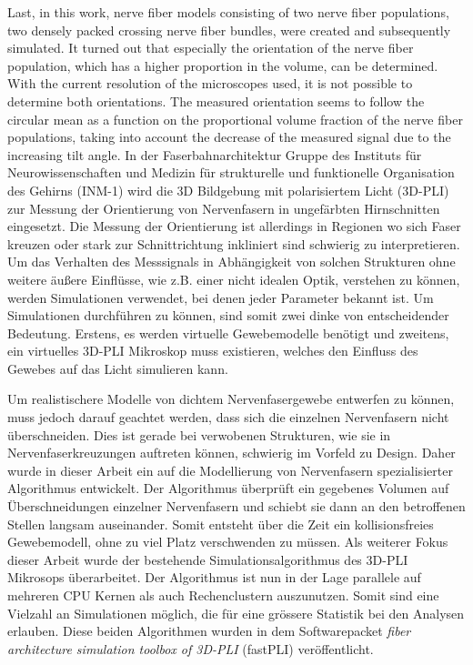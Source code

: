 Last, in this work, nerve fiber models consisting of two nerve fiber populations, two densely packed crossing nerve fiber bundles, were created and subsequently simulated.
It turned out that especially the orientation of the nerve fiber population, which has a higher proportion in the volume, can be determined.
With the current resolution of the microscopes used, it is not possible to determine both orientations.
The measured orientation seems to follow the circular mean as a function on the proportional volume fraction of the nerve fiber populations, taking into account the decrease of the measured signal due to the increasing tilt angle.
% 
% 
% 
% 
In der Faserbahnarchitektur Gruppe des Instituts für Neurowissenschaften und Medizin für strukturelle und funktionelle Organisation des Gehirns (INM-1) wird die 3D Bildgebung mit polarisiertem Licht (3D-PLI) zur Messung der Orientierung von Nervenfasern in ungefärbten Hirnschnitten eingesetzt.
Die Messung der Orientierung ist allerdings in Regionen wo sich Faser kreuzen oder stark zur Schnittrichtung inkliniert sind schwierig zu interpretieren.
Um das Verhalten des Messsignals in Abhängigkeit von solchen Strukturen ohne weitere äußere Einflüsse, wie z.B. einer nicht idealen Optik, verstehen zu können, werden Simulationen verwendet, bei denen jeder Parameter bekannt ist.
Um Simulationen durchführen zu können, sind somit zwei dinke von entscheidender Bedeutung.
Erstens, es werden virtuelle Gewebemodelle benötigt und zweitens, ein virtuelles 3D-PLI Mikroskop muss existieren, welches den Einfluss des Gewebes auf das Licht simulieren kann. 

Um realistischere Modelle von dichtem Nervenfasergewebe entwerfen zu können, muss jedoch darauf geachtet werden, dass sich die einzelnen Nervenfasern nicht überschneiden.
Dies ist gerade bei verwobenen Strukturen, wie sie in Nervenfaserkreuzungen auftreten können, schwierig im Vorfeld zu Design.
Daher wurde in dieser Arbeit ein auf die Modellierung von Nervenfasern spezialisierter Algorithmus entwickelt.
Der Algorithmus überprüft ein gegebenes Volumen auf Überschneidungen einzelner Nervenfasern und schiebt sie dann an den betroffenen Stellen langsam auseinander.
Somit entsteht über die Zeit ein kollisionsfreies Gewebemodell, ohne zu viel Platz verschwenden zu müssen.
Als weiterer Fokus dieser Arbeit wurde der bestehende Simulationsalgorithmus des 3D-PLI Mikrosops überarbeitet.
Der Algorithmus ist nun in der Lage parallele auf mehreren CPU Kernen als auch Rechenclustern auszunutzen.
Somit sind eine Vielzahl an Simulationen möglich, die für eine grössere Statistik bei den Analysen erlauben.
Diese beiden Algorithmen wurden in dem Softwarepacket \textit{fiber architecture simulation toolbox of 3D-PLI} (fastPLI) veröffentlicht. 

